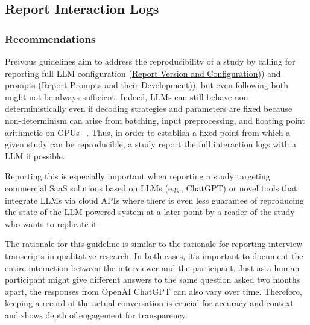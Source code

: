 



\subsection{Report Interaction Logs}

\subsubsection{Recommendations}


Preivous guidelines aim to address the reproducibility of a study by calling for reporting full LLM configuration (\href{/guidelines/#report-veersion-and-configuration}{Report Version and Configuration})) and prompts (\href{/guidelines/#report-prompts}{Report Prompts and their Development})), but even following both might not be always sufficient. Indeed, LLMs can still behave non-deterministically even if decoding strategies and parameters are fixed because non-determinism can arise from batching, input preprocessing, and floating point arithmetic on GPUs ~\cite{Chann2023}. Thus, in order to establish a fixed point from which a given study can be reproducible, a study \should report the full interaction logs with a LLM if possible. 


Reporting this is especially important when reporting a study targeting commercial SaaS solutions based on LLMs (e.g., ChatGPT) or novel tools that integrate LLMs via cloud APIs where there is even less guarantee of reproducing the state of the LLM-powered system at a later point by a reader of the study who wants to replicate it. 



The rationale for this guideline is similar to the rationale for reporting interview transcripts in qualitative research. In both cases, it's important to document the entire interaction between the interviewer and the participant. Just as a human participant might give different answers to the same question asked two months apart, the responses from OpenAI ChatGPT can also vary over time. Therefore, keeping a record of the actual conversation is crucial for accuracy and context and shows depth of engagement for transparency.

